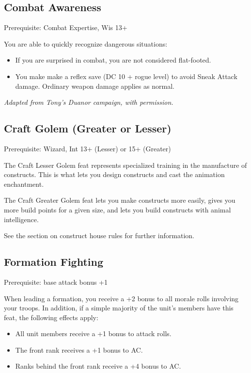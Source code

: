 %
\subsection{Combat Awareness}

Prerequisite: Combat Expertise, Wis 13+

You are able to quickly recognize dangerous situations:
\begin{itemize}
\item If you are surprised in combat, you are not considered flat-footed.
\item You make make a reflex save (DC 10 + rogue level) to avoid Sneak
Attack damage. Ordinary weapon damage applies as normal.
\end{itemize}

\textit{Adapted from Tony's Duanor campaign, with permission.}
%

%
\subsection{Craft Golem (Greater or Lesser)}

Prerequisite: Wizard, Int 13+ (Lesser) or 15+ (Greater)

The Craft Lesser Golem feat represents specialized training in the
manufacture of constructs. This is what lets you design constructs and
cast the animation enchantment.

The Craft Greater Golem feat lets you make constructs more easily, gives
you more build points for a given size, and lets you build constructs with
animal intelligence.

See the section on construct house rules for further information.
%

%
\subsection{Formation Fighting}

Prerequisite: base attack bonus +1

When leading a formation, you receive a +2 bonus to all morale rolls
involving your troops. In addition, if a simple majority of the unit's
members have this feat, the following effects apply:
\begin{itemize}
\item All unit members receive a +1 bonus to attack rolls.
\item The front rank receives a +1 bonus to AC.
\item Ranks behind the front rank receive a +4 bonus to AC.
\end{itemize}

